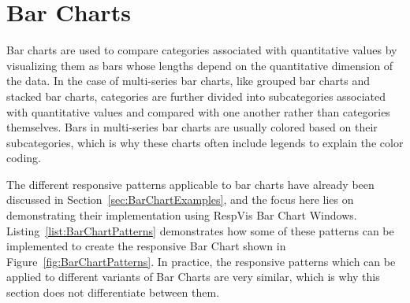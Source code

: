 \section{Bar Charts}
\label{sec:BarChartsUsage}

Bar charts are used to compare categories associated with quantitative
values by visualizing them as bars whose lengths depend on the
quantitative dimension of the data. In the case of multi-series bar
charts, like grouped bar charts and stacked bar charts, categories are
further divided into subcategories associated with quantitative values
and compared with one another rather than categories themselves. Bars
in multi-series bar charts are usually colored based on their
subcategories, which is why these charts often include legends to
explain the color coding.



The different responsive patterns applicable to bar charts have
already been discussed in Section~\ref{sec:BarChartExamples}, and the
focus here lies on demonstrating their implementation using RespVis
Bar Chart Windows. Listing~\ref{list:BarChartPatterns} demonstrates
how some of these patterns can be implemented to create the responsive
Bar Chart shown in Figure~\ref{fig:BarChartPatterns}. In practice, the
responsive patterns which can be applied to different variants of Bar
Charts are very similar, which is why this section does not
differentiate between them.


